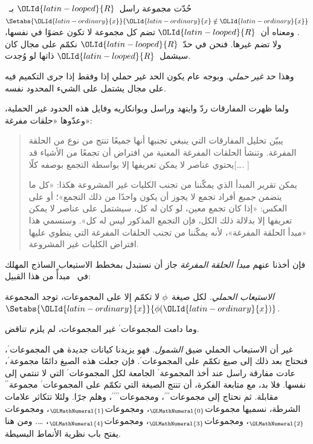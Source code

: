 \documentclass[../../../include/open-logic-section]{subfiles}
\begin{document}


حُدّت مجموعة راسل~${\OLId{latin-looped}{R}}$ بـ~$\Setabs{{\OLId{latin-ordinary}{x}}}{{\OLId{latin-ordinary}{x}} \notin {\OLId{latin-ordinary}{x}}}$. ومعناه أن~${\OLId{latin-looped}{R}}$
تضم كل مجموعة لا تكون عضوًا في نفسها، ولا تضم غيرها. فنحن في حدّ~${\OLId{latin-looped}{R}}$
نكمّم على مجال كان سيشمل~${\OLId{latin-looped}{R}}$ ذاتها لو وُجدت.

وهذا حد \emph{غير حملي}. وبوجه عام يكون الحد غير حملي إذا وفقط إذا
جرى التكميم فيه على مجال يشتمل على الشيء المحدود نفسه.
	
ولما ظهرت المفارقات ردّ وايتهد وراسل وبوانكاريه وفايل هذه الحدود غير
الحملية، وعدّوها «حلقات مفرغة»:
\begin{quote}
	يبيّن تحليل المفارقات التي ينبغي تجنبها أنها جميعًا تنتج من نوع من
	الحلقة المفرغة. وتنشأ الحلقات المفرغة المعنية من افتراض أن تجمعًا من
	الأشياء قد يحتوي عناصر لا يمكن تعريفها إلا بواسطة التجمع بوصفه
	كلًا[\ldots. \textparagraph]

	يمكن تقرير المبدأ الذي يمكّننا من تجنب الكليات غير المشروعة هكذا:
	«كل ما يتضمن \emph{جميع} أفراد تجمع لا يجوز أن يكون واحدًا من ذلك
	التجمع»؛ أو على العكس: «إذا كان تجمع معين، لو كان له كل، سيشتمل على
	عناصر لا يمكن تعريفها إلا بدلالة ذلك الكل، فإن التجمع المذكور ليس له
	كل». وسنسمي هذا «مبدأ الحلقة المفرغة»، لأنه يمكّننا من تجنب الحلقات
	المفرغة التي ينطوي عليها افتراض الكليات غير المشروعة.
	\citep[p.~37]{WhiteheadRussell1910}
\end{quote}
فإن أخذنا عنهم \emph{مبدأ الحلقة المفرغة} جاز أن نستبدل بمخطط
الاستيعاب الساذج المهلك في~ مبدأً من
هذا القبيل:

\begin{defish}
\emph{الاستيعاب الحملي.} لكل صيغة~$\phi$ لا تكمّم إلا على المجموعات،
توجد المجموعة$^\prime$~$\Setabs{{\OLId{latin-ordinary}{x}}}{\phi({\OLId{latin-ordinary}{x}})}$.
\end{defish}

وما دامت المجموعات$^{\prime}$ غير المجموعات، لم يلزم تناقض.

غير أن الاستيعاب الحملي ضيق \emph{الشمول}. فهو يزيدنا كيانات جديدة هي
المجموعات$^\prime$، فنحتاج بعد ذلك إلى صيغ تكمّم على
المجموعات$^\prime$. فإن جعلت هذه الصيغ دائمًا مجموعة$^\prime$، عادت
مفارقة راسل عند أخذ المجموعة$^\prime$ الجامعة لكل
المجموعات$^\prime$ التي لا تنتمي إلى نفسها. فلا بد، مع متابعة الفكرة،
أن تنتج الصيغة التي تكمّم على المجموعات$^\prime$
مجموعة$^{\prime\prime}$ مقابلة. ثم نحتاج إلى
مجموعات$^{\prime\prime\prime}$، ومجموعات$^{\prime\prime\prime\prime}$،
وهلم جرًا. ولئلا تتكاثر علامات الشرطة، نسميها مجموعات$_{\OLMathNumeral{0}}$،
ومجموعات$_{\OLMathNumeral{1}}$، ومجموعات$_{\OLMathNumeral{2}}$، ومجموعات$_{\OLMathNumeral{3}}$، ومجموعات$_{\OLMathNumeral{4}}$، \ldots.
ومن هنا يفتح باب نظرية الأنماط البسيطة.
\end{document}
